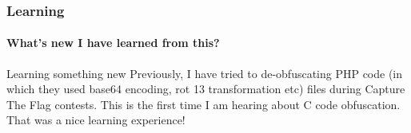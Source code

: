\documentclass[12pt]{beamer}
\begin{document}
\begin{frame}
	\frametitle{Learning}
	\framesubtitle{What's new I have learned from this?}
	\begin{block}{Learning something new}
		Previously, I have tried to de-obfuscating PHP code (in which they used base64 encoding, rot 13 transformation etc) files during Capture The Flag contests. This is the first time I am hearing about C code obfuscation. That was a nice learning experience!
	\end{block}
\end{frame}

\end{document}
